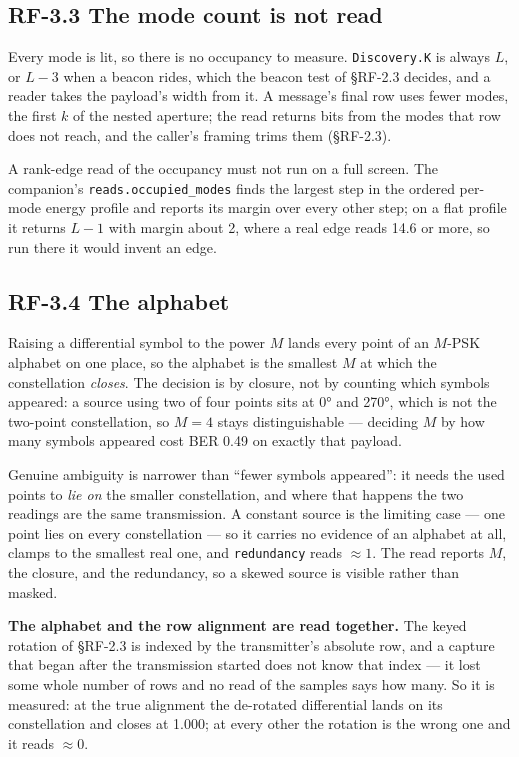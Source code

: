 \documentclass[10pt,letterpaper,twocolumn]{article}
\begin{document}
\subsection{RF-3.3 The mode count is not read}\label{rf-33-the-mode-count-is-not-read}

Every mode is lit, so there is no occupancy to measure. \texttt{Discovery.\allowbreak{}K} is always \(L\), or \(L - 3\) when a beacon rides, which the beacon test of §RF-2.3 decides, and a reader takes the payload's width from it. A message's final row uses fewer modes, the first \(k\) of the nested aperture; the read returns bits from the modes that row does not reach, and the caller's framing trims them (§RF-2.3).

A rank-edge read of the occupancy must not run on a full screen. The companion's \texttt{reads.\allowbreak{}occupied\_\allowbreak{}modes} finds the largest step in the ordered per-mode energy profile and reports its margin over every other step; on a flat profile it returns \(L - 1\) with margin about 2, where a real edge reads 14.6 or more, so run there it would invent an edge.

\subsection{RF-3.4 The alphabet}\label{rf-34-the-alphabet}

Raising a differential symbol to the power \(M\) lands every point of an \(M\)-PSK alphabet on one place, so the alphabet is the smallest \(M\) at which the constellation \emph{closes}. The decision is by closure, not by counting which symbols appeared: a source using two of four points sits at 0° and 270°, which is not the two-point constellation, so \(M=4\) stays distinguishable --- deciding \(M\) by how many symbols appeared cost BER 0.49 on exactly that payload.

Genuine ambiguity is narrower than ``fewer symbols appeared'': it needs the used points to \emph{lie on} the smaller constellation, and where that happens the two readings are the same transmission. A constant source is the limiting case --- one point lies on every constellation --- so it carries no evidence of an alphabet at all, clamps to the smallest real one, and \texttt{redundancy} reads \(\approx 1\). The read reports \(M\), the closure, and the redundancy, so a skewed source is visible rather than masked.

\textbf{The alphabet and the row alignment are read together.} The keyed rotation of §RF-2.3 is indexed by the transmitter's absolute row, and a capture that began after the transmission started does not know that index --- it lost some whole number of rows and no read of the samples says how many. So it is measured: at the true alignment the de-rotated differential lands on its constellation and closes at 1.000; at every other the rotation is the wrong one and it reads \(\approx 0\).
\end{document}
